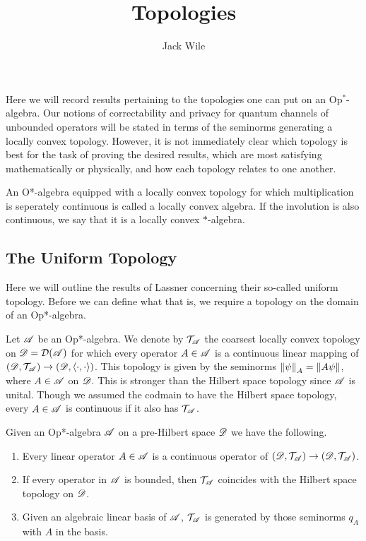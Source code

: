 \documentclass[../main.tex]{subfiles}
\title{Topologies}
\author{Jack Wile}
\date{}
\begin{document}
Here we will record results pertaining to the topologies one can put on an Op$^*$-algebra. Our notions of correctability and privacy
for quantum channels of unbounded operators will be stated in terms of the seminorms generating a locally convex topology. However, it is 
not immediately clear which topology is best for the task of proving the desired results, which are most satisfying mathematically or physically,
and how each topology relates to one another.

\begin{definition}
	An O*-algebra equipped with a locally convex topology for which multiplication is seperately continuous is called
	a locally convex algebra. If the involution is also continuous, we say that it is a locally convex $\ast$-algebra.
\end{definition}


\subsection{The Uniform Topology}

Here we will outline the results of Lassner concerning their so-called uniform topology. Before we can define what that is, we require
a topology on the domain of an Op*-algebra.

Let $\mathscr{A}$ be an Op*-algebra. We denote by $\mathcal{T}_\mathscr{A}$ the coarsest locally convex topology on $\mathscr{D} = \mathcal{D}(\mathscr{A})$
for which every operator $A \in \mathscr{A}$ is a continuous linear mapping of $(\mathscr{D}, \mathcal{T}_\mathscr{A}) \to (\mathscr{D}, \langle \cdot, \cdot \rangle)$.
This topology is given by the seminorms $\left\lVert\psi\right\rVert_A = \|A\psi\|$, where $A \in \mathscr{A}$ on $\mathscr{D}$. This is stronger than the Hilbert 
space topology since $\mathscr{A}$ is unital. Though we assumed the codmain to have the Hilbert space topology, every $A \in \mathscr{A}$ is 
continuous if it also has $\mathcal{T}_\mathscr{A}$.

\begin{theorem}

	Given an Op*-algebra $\mathscr{A}$ on a pre-Hilbert space $\mathscr{D}$ we have the following.
	
	\begin{enumerate}
	\item Every linear operator $A \in \mathscr{A}$ is a continuous operator of $(\mathscr{D}, \mathcal{T}_\mathscr{A}) \to (\mathscr{D}, \mathcal{T}_\mathscr{A})$.
	\item If every operator in $\mathscr{A}$ is bounded, then $\mathcal{T}_\mathscr{A}$ coincides with the Hilbert space topology on $\mathscr{D}$.
	\item Given an algebraic linear basis of $\mathscr{A}$, $\mathcal{T}_\mathscr{A}$ is generated by those seminorms $q_A$ with $A$ in the basis.

	\end{enumerate}

\end{theorem}
\end{document}
